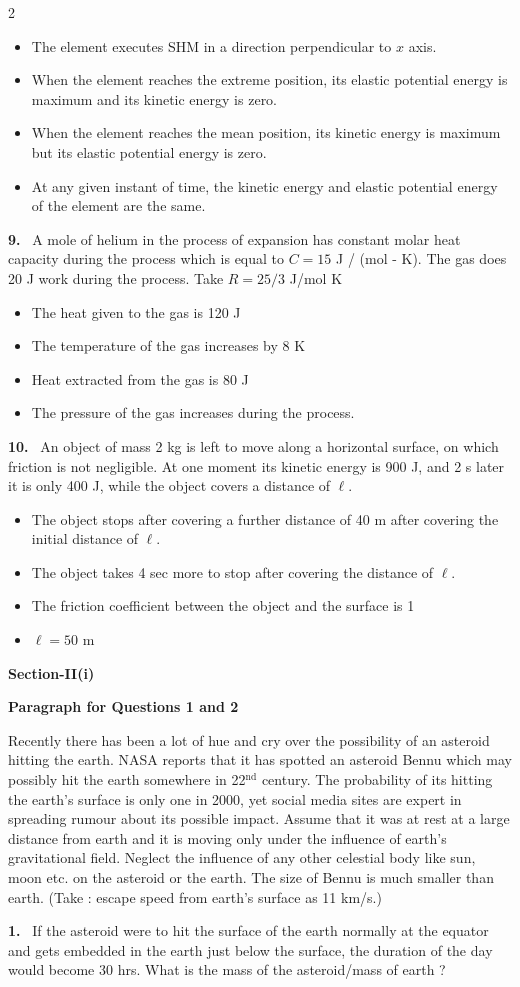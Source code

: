 \documentclass[10pt]{extarticle}
\newcommand{\sect}[1]{\par\smallskip\noindent\textbf{#1}\par}
\newcommand{\qn}[1]{\par\smallskip\noindent\textbf{#1.}~}
\newcommand{\paraq}[2]{\par\smallskip\noindent\textbf{Paragraph for Questions #1 and #2}\par}
\newenvironment{qoptions}{\begin{itemize}[leftmargin=1.8em,itemsep=1pt,topsep=2pt,label={}]}{\end{itemize}}
\newcommand{\opt}[2]{\item[(#1)] #2}
\begin{document}
\begin{multicols}{2}
\begin{qoptions}
\opt{A}{The element executes SHM in a direction perpendicular to $x$ axis.}
\opt{B}{When the element reaches the extreme position, its elastic potential energy is maximum and its kinetic energy is zero.}
\opt{C}{When the element reaches the mean position, its kinetic energy is maximum but its elastic potential energy is zero.}
\opt{D}{At any given instant of time, the kinetic energy and elastic potential energy of the element are the same.}
\end{qoptions}
\qn{9} A mole of helium in the process of expansion has constant molar heat capacity during the process which is equal to $C=15$ J / (mol - K). The gas does 20 J work during the process. Take $R=25/3$ J/mol K
\begin{qoptions}
\opt{A}{The heat given to the gas is 120 J}
\opt{B}{The temperature of the gas increases by 8 K}
\opt{C}{Heat extracted from the gas is 80 J}
\opt{D}{The pressure of the gas increases during the process.}
\end{qoptions}
\qn{10} An object of mass 2 kg is left to move along a horizontal surface, on which friction is not negligible. At one moment its kinetic energy is 900 J, and 2 s later it is only 400 J, while the object covers a distance of $\ell$.
\begin{qoptions}
\opt{A}{The object stops after covering a further distance of 40 m after covering the initial distance of $\ell$.}
\opt{B}{The object takes 4 sec more to stop after covering the distance of $\ell$.}
\opt{C}{The friction coefficient between the object and the surface is 1}
\opt{D}{$\ell=50$ m}
\end{qoptions}
\sect{Section-II(i)}
\paraq{1}{2}
Recently there has been a lot of hue and cry over the possibility of an asteroid hitting the earth. NASA reports that it has spotted an asteroid Bennu which may possibly hit the earth somewhere in 22$^{\text{nd}}$ century. The probability of its hitting the earth's surface is only one in 2000, yet social media sites are expert in spreading rumour about its possible impact. Assume that it was at rest at a large distance from earth and it is moving only under the influence of earth's gravitational field. Neglect the influence of any other celestial body like sun, moon etc. on the asteroid or the earth. The size of Bennu is much smaller than earth. (Take : escape speed from earth's surface as 11 km/s.)
\qn{1} If the asteroid were to hit the surface of the earth normally at the equator and gets embedded in the earth just below the surface, the duration of the day would become 30 hrs. What is the mass of the asteroid/mass of earth ?

\end{multicols}
\end{document}
